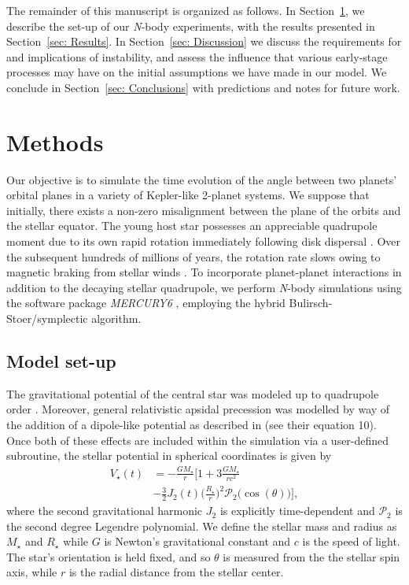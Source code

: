 \documentclass[twocolumn]{aastex63}
\begin{document}
The remainder of this manuscript is organized as follows. In Section~\ref{sec: Methods}, we describe the set-up of our \textit{N}-body experiments, with the results presented in Section~\ref{sec: Results}. In Section~\ref{sec: Discussion} we discuss the requirements for and implications of instability, and assess the influence that various early-stage processes may have on the initial assumptions we have made in our model. We conclude in Section~\ref{sec: Conclusions} with predictions and notes for future work.

\section{Methods}\label{sec: Methods}
Our objective is to simulate the time evolution of the angle between two planets’ orbital planes in a variety of Kepler-like 2-planet systems. We suppose that initially, there exists a non-zero misalignment between the plane of the orbits and the stellar equator. The young host star possesses an appreciable quadrupole moment due to its own rapid rotation immediately following disk dispersal \citep{bouvier2014angular}. Over the subsequent hundreds of millions of years, the rotation rate slows owing to magnetic braking from stellar winds \citep{kraft1967studies}. To incorporate planet-planet interactions in addition to the decaying stellar quadrupole, we perform \textit{N}-body simulations using the software package \textit{MERCURY6} \citep{1999MNRAS.304..793C}, employing the hybrid Bulirsch-Stoer/symplectic algorithm. 

\subsection{Model set-up}

The gravitational potential of the central star was modeled up to quadrupole order \citep{murray1999solar}. Moreover, general relativistic apsidal precession was modelled by way of the addition of a dipole-like potential as described in \citet{nobili1986simulation} (see their equation 10). Once both of these effects are included within the simulation via a user-defined subroutine, the stellar potential in spherical coordinates is given by
\begin{align}\label{eq: potential}
V_\star(t)&=-\frac{G M_\star}{r}\Bigg[1+3\frac{GM_\star}{rc^2}\nonumber\\
&-\frac{3}{2}J_2(t)\bigg(\frac{R_\star}{r}\bigg)^2\mathcal{P}_2\big(\cos(\theta)\big)\Bigg],
\end{align}
where the second gravitational harmonic $J_2$ is explicitly time-dependent and $\mathcal{P}_2$ is the second degree Legendre polynomial. We define the stellar mass and radius as $M_\star$ and $R_\star$ while $G$ is Newton's gravitational constant and $c$ is the speed of light. The star's orientation is held fixed, and so $\theta$ is measured from the the stellar spin axis, while $r$ is the radial distance from the stellar center.
\end{document}
